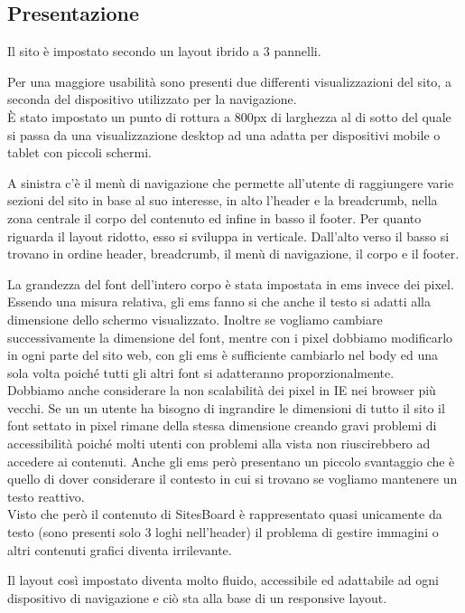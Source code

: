 \documentclass[12pt]{article}
\begin{document}
	\subsection{Presentazione}
	
	Il sito è impostato secondo un layout ibrido a 3 pannelli.\bigskip
	
	Per una maggiore usabilità sono presenti due differenti visualizzazioni del sito, a seconda del dispositivo utilizzato per la navigazione.\\
	È stato impostato un punto di rottura a 800px di larghezza al di sotto del quale si passa da una visualizzazione desktop ad una adatta per dispositivi mobile o tablet con piccoli schermi.\bigskip
	
	A sinistra c'è il menù di navigazione che permette all’utente di raggiungere varie sezioni del sito in base al suo interesse, in alto l'header e la breadcrumb, nella zona centrale il corpo del contenuto ed infine in basso il footer.
Per quanto riguarda il layout ridotto, esso si sviluppa in verticale. Dall’alto verso il basso si trovano in ordine header, breadcrumb, il menù di navigazione, il corpo e il footer.\bigskip
		
	La grandezza del font dell'intero corpo è stata impostata in ems invece dei pixel.
	Essendo una misura relativa, gli ems fanno si che anche il testo si adatti alla dimensione dello schermo visualizzato. Inoltre se vogliamo cambiare successivamente la dimensione del font, mentre con i pixel dobbiamo modificarlo in ogni parte del sito web, con gli ems è sufficiente cambiarlo nel body ed una sola volta poiché tutti gli altri font si adatteranno proporzionalmente.\\
	Dobbiamo anche considerare la non scalabilità dei pixel in IE nei browser più vecchi. Se un un utente ha bisogno di ingrandire le dimensioni di tutto il sito il font settato in pixel rimane della stessa dimensione creando gravi problemi di accessibilità poiché molti utenti con problemi alla vista non riuscirebbero ad accedere ai contenuti.
	Anche gli ems però presentano un piccolo svantaggio che è quello di dover considerare il contesto in cui si trovano se vogliamo mantenere un testo reattivo.\\ Visto che però il contenuto di SitesBoard è rappresentato quasi unicamente da testo (sono presenti solo 3 loghi nell'header) il problema di gestire immagini o altri contenuti grafici diventa irrilevante.
	
	Il layout così impostato diventa molto fluido, accessibile ed adattabile ad ogni dispositivo di navigazione e ciò sta alla base di un responsive layout.
	
\end{document}
